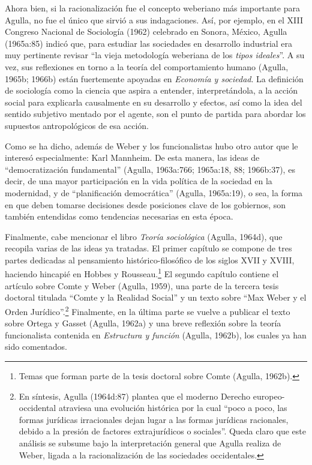 Ahora bien, si la racionalización fue el concepto weberiano más importante para Agulla, no fue el único que sirvió a sus indagaciones. Así, por ejemplo, en el XIII Congreso Nacional de Sociología (1962) celebrado en Sonora, México, Agulla (1965a:85) indicó que, para estudiar las sociedades en desarrollo industrial era muy pertinente revisar ``la vieja metodología weberiana de los \emph{tipos ideales}''. A su vez, sus reflexiones en torno a la teoría del comportamiento humano (Agulla, 1965b; 1966b) están fuertemente apoyadas en \emph{Economía y sociedad}. La definición de sociología como la ciencia que aspira a entender, interpretándola, a la acción social para explicarla causalmente en su desarrollo y efectos, así como la idea del sentido subjetivo mentado por el agente, son el punto de partida para abordar los supuestos antropológicos de esa acción.

Como se ha dicho, además de Weber y los funcionalistas hubo otro autor que le interesó especialmente: Karl Mannheim. De esta manera, las ideas de ``democratización fundamental'' (Agulla, 1963a:766; 1965a:18, 88; 1966b:37), es decir, de una mayor participación en la vida política de la sociedad en la modernidad, y de ``planificación democrática'' (Agulla, 1965a:19), o sea, la forma en que deben tomarse decisiones desde posiciones clave de los gobiernos, son también entendidas como tendencias necesarias en esta época.

Finalmente, cabe mencionar el libro \emph{Teoría sociológica} (Agulla, 1964d), que recopila varias de las ideas ya tratadas. El primer capítulo se compone de tres partes dedicadas al pensamiento histórico-filosófico de los siglos XVII y XVIII, haciendo hincapié en Hobbes y Rousseau.\footnote{Temas que forman parte de la tesis doctoral sobre Comte (Agulla, 1962b).} El segundo capítulo contiene el artículo sobre Comte y Weber (Agulla, 1959), una parte de la tercera tesis doctoral titulada ``Comte y la Realidad Social'' y un texto sobre ``Max Weber y el Orden Jurídico''.\footnote{En síntesis, Agulla (1964d:87) plantea que el moderno Derecho europeo-occidental atraviesa una evolución histórica por la cual ``poco a poco, las formas jurídicas irracionales dejan lugar a las formas jurídicas racionales, debido a la presión de factores extrajurídicos o sociales''. Queda claro que este análisis se subsume bajo la interpretación general que Agulla realiza de Weber, ligada a la racionalización de las sociedades occidentales.} Finalmente, en la última parte se vuelve a publicar el texto sobre Ortega y Gasset (Agulla, 1962a) y una breve reflexión sobre la teoría funcionalista contenida en \emph{Estructura y función} (Agulla, 1962b), los cuales ya han sido comentados.

